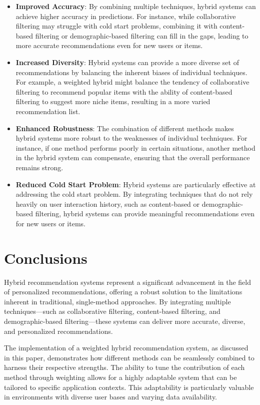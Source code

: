 \documentclass{article}
\begin{document}
\begin{itemize}
    \item \textbf{Improved Accuracy}: By combining multiple techniques, hybrid systems can achieve higher accuracy in predictions. For instance, while collaborative filtering may struggle with cold start problems, combining it with content-based filtering or demographic-based filtering can fill in the gaps, leading to more accurate recommendations even for new users or items.
    \item \textbf{Increased Diversity}: Hybrid systems can provide a more diverse set of recommendations by balancing the inherent biases of individual techniques. For example, a weighted hybrid might balance the tendency of collaborative filtering to recommend popular items with the ability of content-based filtering to suggest more niche items, resulting in a more varied recommendation list.
    \item \textbf{Enhanced Robustness}: The combination of different methods makes hybrid systems more robust to the weaknesses of individual techniques. For instance, if one method performs poorly in certain situations, another method in the hybrid system can compensate, ensuring that the overall performance remains strong.
    \item \textbf{Reduced Cold Start Problem}: Hybrid systems are particularly effective at addressing the cold start problem. By integrating techniques that do not rely heavily on user interaction history, such as content-based or demographic-based filtering, hybrid systems can provide meaningful recommendations even for new users or items.
\end{itemize}

\section{Conclusions}

Hybrid recommendation systems represent a significant advancement in the field of personalized recommendations, offering a robust solution to the limitations inherent in traditional, single-method approaches. By integrating multiple techniques—such as collaborative filtering, content-based filtering, and demographic-based filtering—these systems can deliver more accurate, diverse, and personalized recommendations.

The implementation of a weighted hybrid recommendation system, as discussed in this paper, demonstrates how different methods can be seamlessly combined to harness their respective strengths. The ability to tune the contribution of each method through weighting allows for a highly adaptable system that can be tailored to specific application contexts. This adaptability is particularly valuable in environments with diverse user bases and varying data availability.
\end{document}
